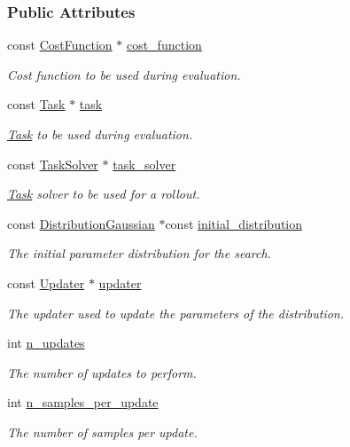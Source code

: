 \subsubsection*{Public Attributes}
\begin{DoxyCompactItemize}
\item 
const \hyperlink{classDmpBbo_1_1CostFunction}{Cost\+Function} $\ast$ \hyperlink{classDmpBbo_1_1ExperimentBBO_aee83479842305376e5232158fd6b1383}{cost\+\_\+function}
\begin{DoxyCompactList}\small\item\em Cost function to be used during evaluation. \end{DoxyCompactList}\item 
const \hyperlink{classDmpBbo_1_1Task}{Task} $\ast$ \hyperlink{classDmpBbo_1_1ExperimentBBO_a2a8fc5ed3ca237057b7b9a4d572739a3}{task}
\begin{DoxyCompactList}\small\item\em \hyperlink{classDmpBbo_1_1Task}{Task} to be used during evaluation. \end{DoxyCompactList}\item 
const \hyperlink{classDmpBbo_1_1TaskSolver}{Task\+Solver} $\ast$ \hyperlink{classDmpBbo_1_1ExperimentBBO_a28912fe456a83b6f10f63c64ba4bfc66}{task\+\_\+solver}
\begin{DoxyCompactList}\small\item\em \hyperlink{classDmpBbo_1_1Task}{Task} solver to be used for a rollout. \end{DoxyCompactList}\item 
const \hyperlink{classDmpBbo_1_1DistributionGaussian}{Distribution\+Gaussian} $\ast$const \hyperlink{classDmpBbo_1_1ExperimentBBO_afae4d001a436497a4c8b74a066ac054a}{initial\+\_\+distribution}
\begin{DoxyCompactList}\small\item\em The initial parameter distribution for the search. \end{DoxyCompactList}\item 
const \hyperlink{classDmpBbo_1_1Updater}{Updater} $\ast$ \hyperlink{classDmpBbo_1_1ExperimentBBO_aaab03971ba0e4eaf9466cc4e33290c96}{updater}
\begin{DoxyCompactList}\small\item\em The updater used to update the parameters of the distribution. \end{DoxyCompactList}\item 
int \hyperlink{classDmpBbo_1_1ExperimentBBO_a96b1f7903bf380880b1482b32cb9efd3}{n\+\_\+updates}
\begin{DoxyCompactList}\small\item\em The number of updates to perform. \end{DoxyCompactList}\item 
int \hyperlink{classDmpBbo_1_1ExperimentBBO_a4fb03395f917e6fa1917a01cc3c07e2a}{n\+\_\+samples\+\_\+per\+\_\+update}
\begin{DoxyCompactList}\small\item\em The number of samples per update. \end{DoxyCompactList}\end{DoxyCompactItemize}


